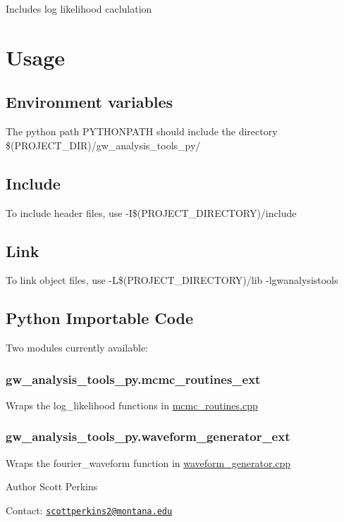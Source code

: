 Includes log likelihood caclulation\hypertarget{index_usage}{}\section{Usage}\label{index_usage}
\hypertarget{index_var}{}\subsection{Environment variables}\label{index_var}
The python path P\+Y\+T\+H\+O\+N\+P\+A\+TH should include the directory \$(P\+R\+O\+J\+E\+C\+T\+\_\+\+D\+IR)/gw\+\_\+analysis\+\_\+tools\+\_\+py/\hypertarget{index_include}{}\subsection{Include}\label{index_include}
To include header files, use -\/I\$(P\+R\+O\+J\+E\+C\+T\+\_\+\+D\+I\+R\+E\+C\+T\+O\+RY)/include\hypertarget{index_link}{}\subsection{Link}\label{index_link}
To link object files, use -\/L\$(P\+R\+O\+J\+E\+C\+T\+\_\+\+D\+I\+R\+E\+C\+T\+O\+RY)/lib -\/lgwanalysistools\hypertarget{index_py}{}\subsection{Python Importable Code}\label{index_py}
Two modules currently available\+:\hypertarget{index_mcmcpy}{}\subsubsection{gw\+\_\+analysis\+\_\+tools\+\_\+py.\+mcmc\+\_\+routines\+\_\+ext}\label{index_mcmcpy}
Wraps the log\+\_\+likelihood functions in \hyperlink{mcmc__routines_8cpp}{mcmc\+\_\+routines.\+cpp}\hypertarget{index_wavegenpy}{}\subsubsection{gw\+\_\+analysis\+\_\+tools\+\_\+py.\+waveform\+\_\+generator\+\_\+ext}\label{index_wavegenpy}
Wraps the fourier\+\_\+waveform function in \hyperlink{waveform__generator_8cpp}{waveform\+\_\+generator.\+cpp}

\begin{DoxyAuthor}{Author}
Scott Perkins
\end{DoxyAuthor}
Contact\+: \href{mailto:scottperkins2@montana.edu}{\tt scottperkins2@montana.\+edu} 
